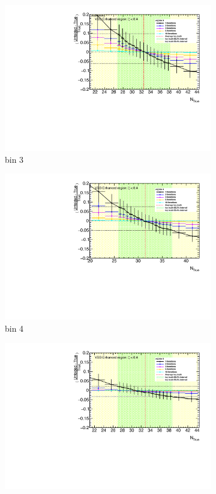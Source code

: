 \begin{figure}[htb]
\begin{subfigure}{.48\textwidth}
        \includegraphics[width=.9\linewidth]{figures/Analysis/Unfolding/unfoldingbias/unfolding_bias_mjj_noFakes_VBSEnh_bin3.pdf}
        \caption{ bin 3 }
    \end{subfigure}
    \begin{subfigure}{.48\textwidth}
        \centering
        \includegraphics[width=.9\linewidth]{figures/Analysis/Unfolding/unfoldingbias/unfolding_bias_mjj_noFakes_VBSEnh_bin4.pdf}
        \caption{bin 4 }
    \end{subfigure}
    \begin{subfigure}{.48\textwidth}
        \centering
        \includegraphics[width=.9\linewidth]{figures/Analysis/Unfolding/unfoldingbias/unfolding_bias_mjj_noFakes_VBSEnh_bin5.pdf}

\end{subfigure}
\end{figure}
